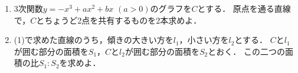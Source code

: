 \documentclass[../../main.tex]{subfiles}
\begin{document}
\begin{enumerate}
  \item 3次関数$y=-x^3+ax^2+bx$ $(a>0)$のグラフを$C$とする．
    原点を通る直線で，$C$とちょうど2点を共有するものを2本求めよ．
  \item (1)で求めた直線のうち，傾きの大きい方を$l_1$，小さい方を$l_2$とする．
    $C$と$l_1$が囲む部分の面積を$S_1$，$C$と$l_2$が囲む部分の面積を$S_2$とおく．
    この二つの面積の比$S_1:S_2$を求めよ．
\end{enumerate}
\end{document}
